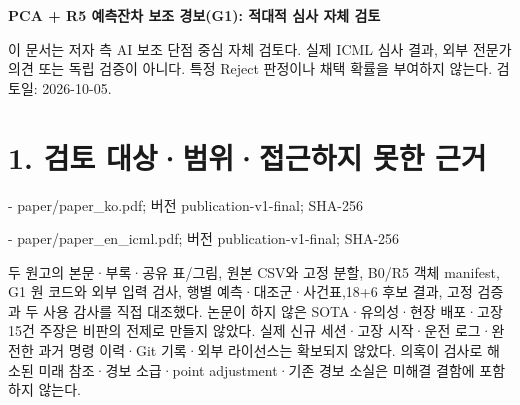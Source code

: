 \documentclass[11pt,a4paper]{article}
\begin{document}
{\LARGE\bfseries PCA + R5 예측잔차 보조 경보(G1): 적대적 심사 자체 검토\par}

이 문서는 저자 측 AI 보조 단점 중심 자체 검토다. 실제 ICML 심사 결과, 외부 전문가 의견 또는 독립 검증이 아니다. 특정 Reject 판정이나 채택 확률을 부여하지 않는다. 검토일: 2026-10-05.
\par
\section*{1. 검토 대상·범위·접근하지 못한 근거}
- paper/paper\_ko.pdf; 버전 publication-v1-final; SHA-256 \par
- paper/paper\_en\_icml.pdf; 버전 publication-v1-final; SHA-256 \par
두 원고의 본문·부록·공유 표/그림, 원본 CSV와 고정 분할, B0/R5 객체 manifest, G1 원 코드와 외부 입력 검사, 행별 예측·대조군·사건표,18+6 후보 결과, 고정 검증과 두 사용 감사를 직접 대조했다. 논문이 하지 않은 SOTA·유의성·현장 배포·고장15건 주장은 비판의 전제로 만들지 않았다. 실제 신규 세션·고장 시작·운전 로그·완전한 과거 명령 이력·Git 기록·외부 라이선스는 확보되지 않았다. 의혹이 검사로 해소된 미래 참조·경보 소급·point adjustment·기존 경보 소실은 미해결 결함에 포함하지 않는다.\par
\end{document}
